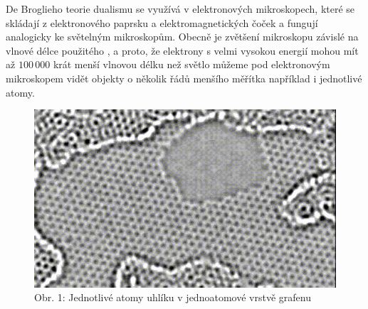 \documentclass{../../../../style/mkimain}
\begin{document}
\noindent{}
\proborigin{}
\klein
De Broglieho teorie dualismu se využívá v elektronových mikroskopech, které se skládají z elektronového paprsku a
elektromagnetických čoček a fungují analogicky ke světelným mikroskopům.
Obecně je zvětšení mikroskopu závislé na vlnové délce použitého , a proto, že elektrony s velmi vysokou
energií mohou mít až $100\,000$ krát menší vlnovou délku než světlo můžeme pod elektronovým mikroskopem vidět objekty o 
několik řádů menšího měřítka například i jednotlivé atomy.

\begin{figure}[H]
    \begin{center}
    \includegraphics[scale=0.37]{grafen.png}\\
    \vspace{0.15cm}
        Obr. 1: Jednotlivé atomy uhlíku v jednoatomové vrstvě grafenu
    \end{center}
\end{figure}
\end{document}

